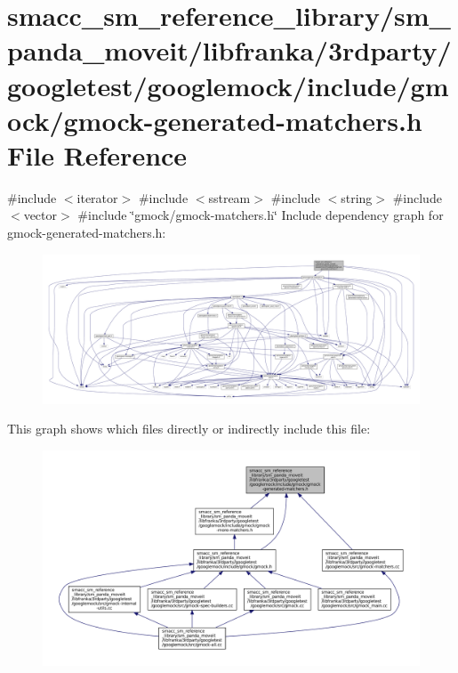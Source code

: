 \hypertarget{gmock-generated-matchers_8h}{}\section{smacc\+\_\+sm\+\_\+reference\+\_\+library/sm\+\_\+panda\+\_\+moveit/libfranka/3rdparty/googletest/googlemock/include/gmock/gmock-\/generated-\/matchers.h File Reference}
\label{gmock-generated-matchers_8h}
{\ttfamily \#include $<$iterator$>$}\newline
{\ttfamily \#include $<$sstream$>$}\newline
{\ttfamily \#include $<$string$>$}\newline
{\ttfamily \#include $<$vector$>$}\newline
{\ttfamily \#include \char`\"{}gmock/gmock-\/matchers.\+h\char`\"{}}\newline
Include dependency graph for gmock-\/generated-\/matchers.h\+:
\nopagebreak
\begin{figure}[H]
\begin{center}
\leavevmode
\includegraphics[width=350pt]{gmock-generated-matchers_8h__incl}
\end{center}
\end{figure}
This graph shows which files directly or indirectly include this file\+:
\nopagebreak
\begin{figure}[H]
\begin{center}
\leavevmode
\includegraphics[width=350pt]{gmock-generated-matchers_8h__dep__incl}
\end{center}
\end{figure}
